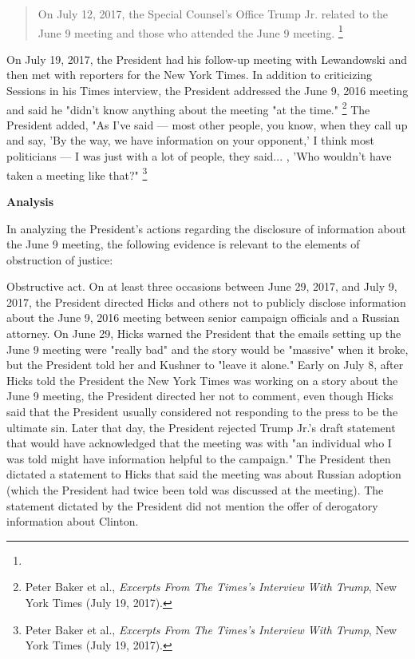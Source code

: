 {\begin{quote}
On July 12, 2017, the Special Counsel's Office  Trump Jr.
 related to the June 9 meeting and those who attended the June 9 meeting.%
\footnote{}
\end{quote}

On July 19, 2017, the President had his follow-up meeting with Lewandowski and then met with reporters for the New York Times.
In addition to criticizing Sessions in his Times interview, the President addressed the June 9, 2016 meeting and said he "didn't know anything about the meeting "at the time."%
\footnote{Peter Baker et al., \textit{Excerpts From The Times’s Interview With Trump}, New York Times (July 19, 2017).}
The President added, "As I've said — most other people, you know, when they call up and say, 'By the way, we have information on your opponent,' I think most politicians — I was just with a lot of people, they said... ,
'Who wouldn't have taken a meeting like that?"%
\footnote{Peter Baker et al., \textit{Excerpts From The Times’s Interview With Trump}, New York Times (July 19, 2017).}

\begin{center}
\textbf{Analysis}
\end{center}

In analyzing the President's actions regarding the disclosure of information about the June 9 meeting, the following evidence is relevant to the elements of obstruction of justice:

Obstructive act.
On at least three occasions between June 29, 2017, and July 9, 2017, the President directed Hicks and others not to publicly disclose information about the June 9, 2016 meeting between senior campaign officials and a Russian attorney.
On June 29, Hicks warned the President that the emails setting up the June 9 meeting were "really bad" and the story would be "massive" when it broke, but the President told her and Kushner to "leave it alone."
Early on July 8, after Hicks told the President the New York Times was working on a story about the June 9 meeting, the President directed her not to comment, even though Hicks said that the President usually considered not responding to the press to be the ultimate sin.
Later that day, the President rejected Trump Jr.'s draft statement that would have acknowledged that the meeting was with "an individual who I was told might have information helpful to the campaign." The President then dictated a statement to Hicks that said the meeting was about Russian adoption (which the President had twice been told was discussed at the meeting).
The statement dictated by the President did not mention the offer of derogatory information about Clinton.

}
